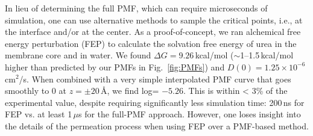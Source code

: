   \par In lieu of determining the full PMF, which can require microseconds of simulation, one can use alternative methods to sample the critical points, i.e., at the interface and/or at the center.  As a proof-of-concept, we ran alchemical free energy perturbation (FEP) to calculate the solvation free energy of urea in the membrane core and in water.  We found $\Delta G = 9.26$\,kcal/mol ($\sim$1--1.5\,kcal/mol higher than predicted by our PMFs in Fig.~\ref{fig:PMFs}) and $D(0) = 1.25\times 10^{-6}$\,cm$^2$/s.  When combined with a very simple interpolated PMF curve that goes smoothly to 0 at $z=\pm20$\,\AA, we find log\perm = $-5.26$.  This is within < 3\% of the experimental value, despite requiring significantly less simulation time: 200\,ns for FEP vs. at least 1\,$\mu$s for the full-PMF approach.  However, one loses insight into the details of the permeation process when using FEP over a PMF-based method.


